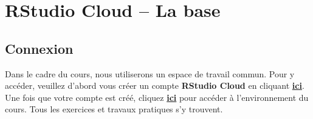 \documentclass[10.5pt,a4paper]{article}
\begin{document}
\section{RStudio Cloud -- La base}
  \subsection{Connexion}
  Dans le cadre du cours, nous utiliserons un espace de travail commun. Pour y accéder, veuillez d'abord vous créer un compte \textbf{RStudio Cloud} en cliquant \href{https://login.rstudio.cloud/register?redirect=https\%3A\%2F\%2Fclient.login.rstudio.cloud\%2Foauth\%2Flogin\%3Fshow_auth\%3D0\%26show_login\%3D0\%26show_setup\%3D0}{\textbf{ici}}. Une fois que votre compte est créé, cliquez \href{https://can01.safelinks.protection.outlook.com/?url=https\%3A\%2F\%2Flogin.rstudio.cloud\%2Finvite\%3Fspace_name\%3DPOL\%2B2000-Z\%2BM\%25C3\%25A9thodes\%2Bquantitatives\%26code\%3D9tltN\%252ByVLqitCL1rVgCB\%252F\%252B0V8rk0Wtqxp\%252Fl6uW8J&amp;data=04\%7C01\%7Cwilliam.poirier.1\%40ulaval.ca\%7C9119a0b3a3fa4119007208d987439312\%7C56778bd56a3f4bd3a26593163e4d5bfe\%7C1\%7C0\%7C637689547430424200\%7CUnknown\%7CTWFpbGZsb3d8eyJWIjoiMC4wLjAwMDAiLCJQIjoiV2luMzIiLCJBTiI6Ik1haWwiLCJXVCI6Mn0\%3D\%7C0&amp;sdata=EMbletbv2\%2Bu9\%2FKSqkqJbRadybcaee2t2S2\%2F8MNRvJgQ\%3D&amp;reserved=0}{\textbf{ici}} pour accéder à l'environnement du cours. Tous les exercices et travaux pratiques s’y trouvent.
  
\end{document}
